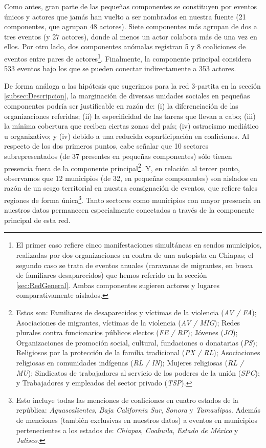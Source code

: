 \documentclass[letterpaper, 11pt]{book}
\theoremstyle{definition}
\theoremstyle{remark}
\begin{document}
Como antes, gran parte de las pequeñas componentes se constituyen por eventos únicos y actores que jamás han vuelto a ser nombrados en nuestra fuente (21 componentes, que agrupan 48 actores). 
Siete componentes más agrupan de dos a tres eventos (y 27 actores), donde al menos un actor colabora más de una vez en ellos. 
Por otro lado, dos componentes anómalas registran 5 y 8 coaliciones de eventos entre pares de actores\footnote{
    El primer caso refiere cinco manifestaciones simultáneas en sendos municipios, realizadas por dos organizaciones en contra de una autopista en Chiapas; el segundo caso se trata de eventos anuales (caravanas de migrantes, en busca de familiares desaparecidos) que hemos referido en la sección \ref{sec:RedGeneral}. 
    Ambas componentes sugieren actores y lugares comparativamente aislados. 
}. 
Finalmente, la componente principal considera 533 eventos bajo los que se pueden conectar indirectamente a 353 actores. 


De forma análoga a las hipótesis que sugerimos para la red 3-partita en la sección \ref{subsec:Descripcion}, la marginación de diversas unidades sociales en pequeñas componentes podría ser justificable en razón de: 
(i) la diferenciación de las organizaciones referidas; 
(ii) la especificidad de las tareas que llevan a cabo; 
(iii) la mínima cobertura que reciben ciertas zonas del país; 
(iv) ostracismo mediático u organizativo; 
y (iv) debido a una reducida coparticipación en coaliciones. 
Al respecto de los dos primeros puntos, cabe señalar que 10 sectores subrepresentados (de 37 presentes en pequeñas componentes) sólo tienen presencia fuera de la componente principal\footnote{
    Estos son: 
    Familiares de desaparecidos y víctimas de la violencia (\emph{AV / FA}); 
    Asociaciones de migrantes, víctimas de la violencia (\emph{AV / MIG}); 
    Redes plurales contra funcionarios públicos electos (\emph{FE / RP}); 
    Jóvenes (\emph{JO}); 
    Organizaciones de promoción social, cultural, fundaciones o donatarias (\emph{PS}); 
    Religiosos por la protección de la familia tradicional (\emph{PX / RL}); 
    Asociaciones religiosas en comunidades indígenas (\emph{RL / IN}); 
    Mujeres religiosas (\emph{RL / MU}); 
    Sindicatos de trabajadores al servicio de los poderes de la unión (\emph{SPC}); 
    y Trabajadores y empleados del sector privado (\emph{TSP}). 
}. 
Y, en relación al tercer punto, observamos que 12 municipios (de 32, en pequeñas componentes) son aislados en razón de un sesgo territorial en nuestra consignación de eventos, que refiere tales regiones de forma única\footnote{
    Esto incluye todas las menciones de coaliciones en cuatro estados de la república: \emph{Aguascalientes}, \emph{Baja California Sur}, \emph{Sonora} y \emph{Tamaulipas}. 
    Además de menciones (también exclusivas en nuestros datos) a eventos en municipios pertenecientes a los estados de: \emph{Chiapas}, \emph{Coahuila}, \emph{Estado de México} y \emph{Jalisco}.
}. 
Tanto sectores como municipios con mayor presencia en nuestros datos permanecen especialmente conectados a través de la componente principal de esta red. 
\end{document}
